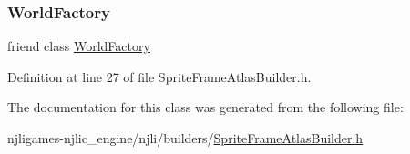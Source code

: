 \subsubsection{\texorpdfstring{World\+Factory}{WorldFactory}}
{\footnotesize\ttfamily friend class \mbox{\hyperlink{classnjli_1_1_world_factory}{World\+Factory}}\hspace{0.3cm}{\ttfamily [friend]}}



Definition at line 27 of file Sprite\+Frame\+Atlas\+Builder.\+h.



The documentation for this class was generated from the following file\+:\begin{DoxyCompactItemize}
\item 
njligames-\/njlic\+\_\+engine/njli/builders/\mbox{\hyperlink{_sprite_frame_atlas_builder_8h}{Sprite\+Frame\+Atlas\+Builder.\+h}}\end{DoxyCompactItemize}
